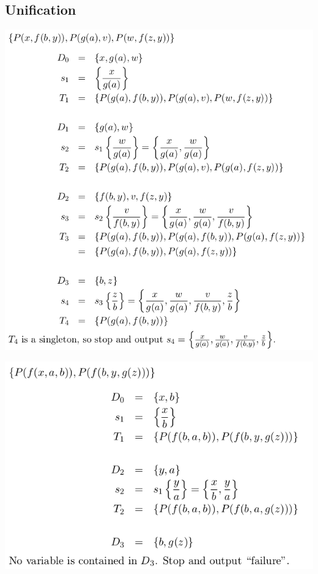 \documentclass[conference]{styles/acmsiggraph}
\begin{document}
\subsection{Unification}


\begin{minipage}[b]{0.5\linewidth}
\includegraphics[width=\textwidth]{imgs/unification.png}
\end{minipage}
\begin{minipage}[b]{0.5\linewidth}
\includegraphics[width=\textwidth]{imgs/unification2.png}
\end{minipage}
\end{document}
